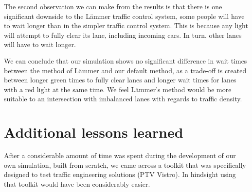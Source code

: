 \documentclass{article}
\begin{document}
The second observation we can make from the results is that there is one significant downside to the L{\"a}mmer traffic control system, some people will have to wait longer than in the simpler traffic control system. This is because any light will attempt to fully clear its lane, including incoming cars. In turn, other lanes will have to wait longer.

We can conclude that our simulation shows no significant difference in wait times between the method of L\"{a}mmer and our default method, as a trade-off is created between longer green times to fully clear lanes and longer wait times for lanes with a red light at the same time. We feel L\"{a}mmer's method would be more suitable to an intersection with imbalanced lanes with regards to traffic density.


\section{Additional lessons learned}
After a considerable amount of time was spent during the development of our own simulation, built from scratch, we came across a toolkit that was specifically designed to test traffic engineering solutions (PTV Vistro). In hindsight using that toolkit would have been considerably easier.



\end{document}
